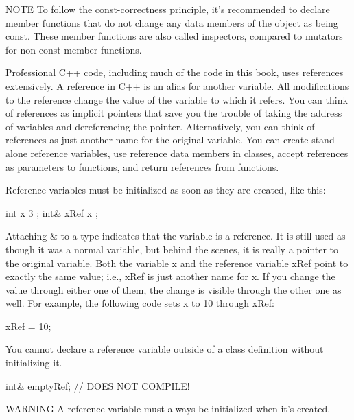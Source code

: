 \begin{myNotic}{NOTE}
To follow the const-correctness principle, it’s recommended to declare member functions that do not change any data members of the object as being const. These member functions are also called inspectors, compared to mutators for non-const member functions.
\end{myNotic}


Professional C++ code, including much of the code in this book, uses references extensively. A reference in C++ is an alias for another variable. All modifications to the reference change the value of the variable to which it refers. You can think of references as implicit pointers that save you the trouble of taking the address of variables and dereferencing the pointer. Alternatively, you can think of references as just another name for the original variable. You can create stand-alone reference variables, use reference data members in classes, accept references as parameters to functions, and return references from functions.


Reference variables must be initialized as soon as they are created, like this:

\begin{cpp}
int x { 3 };
int& xRef { x };
\end{cpp}

Attaching \& to a type indicates that the variable is a reference. It is still used as though it was a normal variable, but behind the scenes, it is really a pointer to the original variable. Both the variable x and the reference variable xRef point to exactly the same value; i.e., xRef is just another name for x. If you change the value through either one of them, the change is visible through the other one as well. For example, the following code sets x to 10 through xRef:

\begin{cpp}
xRef = 10;
\end{cpp}

You cannot declare a reference variable outside of a class definition without initializing it.

\begin{cpp}
int& emptyRef; // DOES NOT COMPILE!
\end{cpp}

\begin{myWarning}{WARNING}
A reference variable must always be initialized when it’s created.
\end{myWarning}

